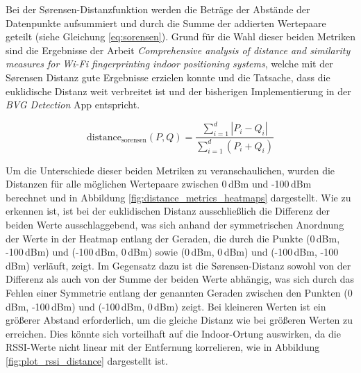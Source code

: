 Bei der Sørensen-Distanzfunktion werden die Beträge der Abstände der Datenpunkte aufsummiert und durch die Summe der addierten Wertepaare geteilt (siehe Gleichung \ref{eq:sorensen}). Grund für die Wahl dieser beiden Metriken sind die Ergebnisse der Arbeit \textit{Comprehensive analysis of distance and similarity measures for Wi-Fi fingerprinting indoor positioning systems}, welche mit der Sørensen Distanz gute Ergebnisse erzielen konnte und die Tatsache, dass die euklidische Distanz weit verbreitet ist und der bisherigen Implementierung in der \textit{BVG Detection} App entspricht.

\begin{equation}
    \label{eq:sorensen}
    \text{distance}_{\text{sorensen}}(P, Q) = \frac{\sum_{i=1}^{d} |P_i - Q_i|}{\sum_{i=1}^{d} (P_i + Q_i)}
\end{equation}

Um die Unterschiede dieser beiden Metriken zu veranschaulichen, wurden die Distanzen für alle möglichen Wertepaare zwischen 0\,dBm und -100\,dBm berechnet und in Abbildung \ref{fig:distance_metrics_heatmaps} dargestellt. Wie zu erkennen ist, ist bei der euklidischen Distanz ausschließlich die Differenz der beiden Werte ausschlaggebend, was sich anhand der symmetrischen Anordnung der Werte in der Heatmap entlang der Geraden, die durch die Punkte (0\,dBm, -100\,dBm) und (-100\,dBm, 0\,dBm) sowie (0\,dBm, 0\,dBm) und (-100\,dBm, -100\,dBm) verläuft, zeigt. Im Gegensatz dazu ist die Sørensen-Distanz sowohl von der Differenz als auch von der Summe der beiden Werte abhängig, was sich durch das Fehlen einer Symmetrie entlang der genannten Geraden zwischen den Punkten (0\,dBm, -100\,dBm) und (-100\,dBm, 0\,dBm) zeigt. Bei kleineren Werten ist ein größerer Abstand erforderlich, um die gleiche Distanz wie bei größeren Werten zu erreichen. Dies könnte sich vorteilhaft auf die Indoor-Ortung auswirken, da die RSSI-Werte nicht linear mit der Entfernung korrelieren, wie in Abbildung \ref{fig:plot_rssi_distance} dargestellt ist.




